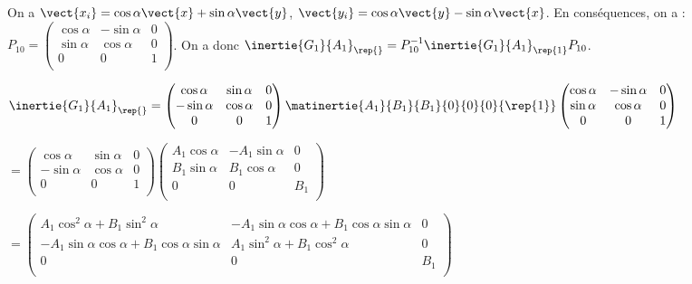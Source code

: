 \else
\fi

\ifprof
\begin{corrige}
 On a $\vect{x_i}=\cos\alpha\vect{x}+\sin\alpha\vect{y}$, $\vect{y_i}=\cos\alpha\vect{y}-\sin\alpha\vect{x}$. 
 En conséquences, on a : 
$P_{10}=\begin{pmatrix} \cos \alpha & - \sin\alpha & 0 \\ \sin \alpha & \cos \alpha & 0 \\ 0 & 0 & 1 \\ \end{pmatrix}$. 
On a donc 
$\inertie{G_1}{A_1}_{\rep{}}=P_{10}^{-1}\inertie{G_1}{A_1}_{\rep{1}}P_{10}$. 

$\inertie{G_1}{A_1}_{\rep{}}=
\begin{pmatrix} \cos \alpha & \sin\alpha & 0 \\-\sin \alpha & \cos \alpha & 0 \\ 0 & 0 & 1 \\ \end{pmatrix}
\matinertie{A_1}{B_1}{B_1}{0}{0}{0}{\rep{1}}
\begin{pmatrix} \cos \alpha & - \sin\alpha & 0 \\ \sin \alpha & \cos \alpha & 0 \\ 0 & 0 & 1 \\ \end{pmatrix}
$

$=
\begin{pmatrix} \cos \alpha & \sin\alpha & 0 \\-\sin \alpha & \cos \alpha & 0 \\ 0 & 0 & 1 \\ \end{pmatrix}
\begin{pmatrix}A_1 \cos \alpha & -A_1 \sin\alpha & 0 \\ B_1\sin \alpha & B_1\cos \alpha & 0 \\ 0 & 0 & B_1 \\ \end{pmatrix}
$

$=
\begin{pmatrix}
A_1 \cos^2\alpha +B_1 \sin^2\alpha& -A_1 \sin\alpha\cos\alpha+B_1\cos\alpha\sin\alpha & 0 \\ 
-A_1\sin \alpha\cos\alpha+B_1\cos\alpha\sin\alpha  &A_1\sin^2\alpha+ B_1\cos^2 \alpha & 0 \\ 0 & 0 & B_1 \\ \end{pmatrix}
$


\end{corrige}
